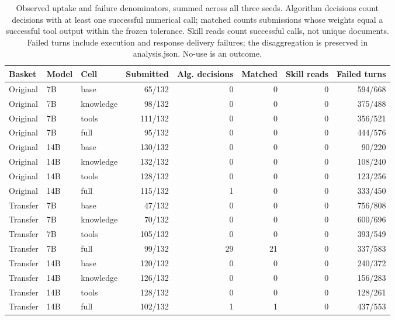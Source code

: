 \begin{table}[t]
\centering\small
\setlength{\tabcolsep}{4pt}
\begin{tabular}{lllrrrrr}
\toprule
Basket & Model & Cell & Submitted & Alg. decisions & Matched & Skill reads & Failed turns \\
\midrule
Original & 7B & base & 65/132 & 0 & 0 & 0 & 594/668 \\
Original & 7B & knowledge & 98/132 & 0 & 0 & 0 & 375/488 \\
Original & 7B & tools & 111/132 & 0 & 0 & 0 & 356/521 \\
Original & 7B & full & 95/132 & 0 & 0 & 0 & 444/576 \\
Original & 14B & base & 130/132 & 0 & 0 & 0 & 90/220 \\
Original & 14B & knowledge & 132/132 & 0 & 0 & 0 & 108/240 \\
Original & 14B & tools & 128/132 & 0 & 0 & 0 & 123/256 \\
Original & 14B & full & 115/132 & 1 & 0 & 0 & 333/450 \\
Transfer & 7B & base & 47/132 & 0 & 0 & 0 & 756/808 \\
Transfer & 7B & knowledge & 70/132 & 0 & 0 & 0 & 600/696 \\
Transfer & 7B & tools & 105/132 & 0 & 0 & 0 & 393/549 \\
Transfer & 7B & full & 99/132 & 29 & 21 & 0 & 337/583 \\
Transfer & 14B & base & 120/132 & 0 & 0 & 0 & 240/372 \\
Transfer & 14B & knowledge & 126/132 & 0 & 0 & 0 & 156/283 \\
Transfer & 14B & tools & 128/132 & 0 & 0 & 0 & 128/261 \\
Transfer & 14B & full & 102/132 & 1 & 1 & 0 & 437/553 \\
\bottomrule
\end{tabular}
\caption{Observed uptake and failure denominators, summed across all three seeds. Algorithm decisions count decisions with at least one successful numerical call; matched counts submissions whose weights equal a successful tool output within the frozen tolerance. Skill reads count successful calls, not unique documents. Failed turns include execution and response delivery failures; the disaggregation is preserved in analysis.json. No-use is an outcome.}
\label{tab:factorial-use}
\end{table}
